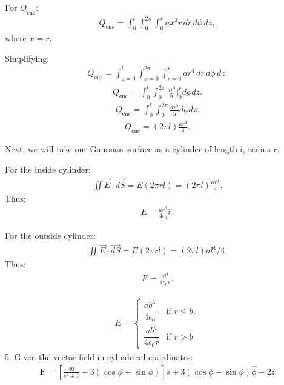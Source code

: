 \documentclass{article}
\begin{document}
For $ Q_{\text{enc}} $:
\begin{align*}
Q_{\text{enc}} = \int_0^l \int_0^{2\pi} \int_0^r a x^3 r \, dr \, d\phi \, dz,
\end{align*}
where $ x = r $.

Simplifying:
\begin{align*}
Q_{\text{enc}} = \int_{z=0}^l \int_{\phi=0}^{2\pi} \int_{r=0}^r a r^4 \, dr \, d\phi \, dz.
\end{align*}
\begin{align*}
Q_{\text{enc}} = \int_0^l \int_0^{2\pi} \frac{a r^5}{5} \Big|_0^r d\phi dz.
\end{align*}
\begin{align*}
Q_{\text{enc}} = \int_0^l \int_0^{2\pi} \frac{a r^5}{5} d\phi dz.
\end{align*}
\begin{align*}
Q_{\text{enc}} = (2\pi l) \frac{a r^4}{4}.
\end{align*}

Next, we will take our Gaussian surface as a cylinder of length $ l $, radius $ r $.

For the inside cylinder:
\begin{align*}
\iint \vec{E} \cdot \vec{dS} = E (2\pi r l) = (2\pi l) \frac{a r^4}{4}.
\end{align*}
Thus:
\begin{align*}
E = \frac{a r^3}{4 \epsilon_0} \hat{r}.
\end{align*}

For the outside cylinder:
\begin{align*}
\iint \vec{E} \cdot \vec{dS} = E (2\pi r l) = (2\pi l) a l^4 / 4.
\end{align*}
Thus:
\begin{align*}
E = \frac{a l^4}{4 \epsilon_0 r}.
\end{align*}

\begin{align*}
E =
\begin{cases} 
\dfrac{ab^3}{4\epsilon_0} & \text{if } r \leq b, \\
\dfrac{ab^4}{4\epsilon_0 r} & \text{if } r > b.
\end{cases}
\end{align*}
5. Given the vector field in cylindrical coordinates:
\begin{align*}
\mathbf{F} = \left[ \frac{40}{s^2 + 1} + 3(\cos \phi + \sin \phi) \right] \hat{s} 
+ 3(\cos \phi - \sin \phi) \hat{\phi} - 2\hat{z}
\end{align*}
\end{document}
